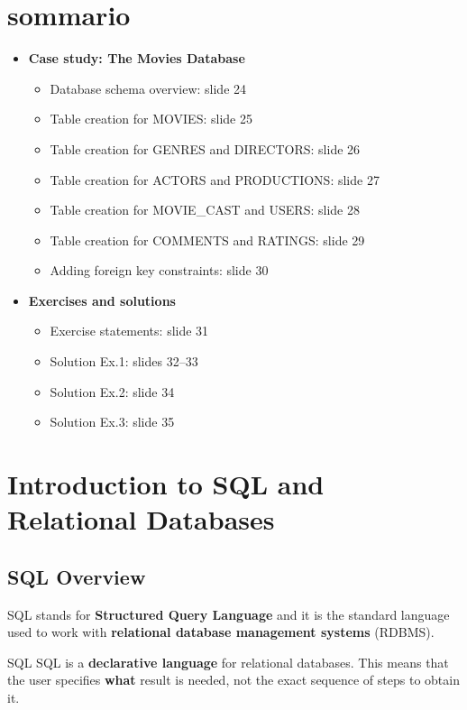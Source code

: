 

\section{sommario}
\begin{itemize}


  \item \textbf{Case study: The Movies Database}
  \begin{itemize}
    \item Database schema overview: slide 24
    \item Table creation for MOVIES: slide 25
    \item Table creation for GENRES and DIRECTORS: slide 26
    \item Table creation for ACTORS and PRODUCTIONS: slide 27
    \item Table creation for MOVIE\_CAST and USERS: slide 28
    \item Table creation for COMMENTS and RATINGS: slide 29
    \item Adding foreign key constraints: slide 30
  \end{itemize}

  \item \textbf{Exercises and solutions}
  \begin{itemize}
    \item Exercise statements: slide 31
    \item Solution Ex.1: slides 32--33
    \item Solution Ex.2: slide 34
    \item Solution Ex.3: slide 35
  \end{itemize}
\end{itemize}

\pagebreak


\section{Introduction to SQL and Relational Databases}

 \subsection{SQL Overview}

 SQL stands for \textbf{Structured Query Language} and it is the standard language used to work with \textbf{relational database management systems} (RDBMS).

 \begin{defbox}{SQL}
  SQL is a \textbf{declarative language} for relational databases. This means that the user specifies \textbf{what} result is needed, not the exact sequence of steps to obtain it.
 \end{defbox}

